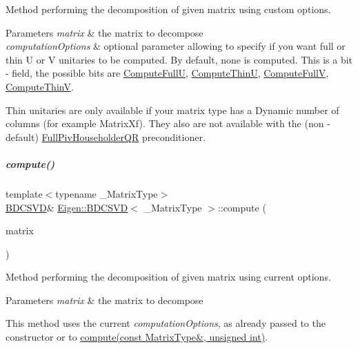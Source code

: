 Method performing the decomposition of given matrix using custom options. 


\begin{DoxyParams}{Parameters}
{\em matrix} & the matrix to decompose \\
\hline
{\em computation\+Options} & optional parameter allowing to specify if you want full or thin U or V unitaries to be computed. By default, none is computed. This is a bit -\/ field, the possible bits are \hyperlink{group__enums_ggae3e239fb70022eb8747994cf5d68b4a9a2b4f91ca5859a4159dbfe8090043817f}{Compute\+FullU}, \hyperlink{group__enums_ggae3e239fb70022eb8747994cf5d68b4a9af8c742a1aa87773e165eae406c9ccaf8}{Compute\+ThinU}, \hyperlink{group__enums_ggae3e239fb70022eb8747994cf5d68b4a9a52c6f7e80bbf9a42297c88f700245b51}{Compute\+FullV}, \hyperlink{group__enums_ggae3e239fb70022eb8747994cf5d68b4a9a1055e53fa95c8ae04a07ebb72cfafd95}{Compute\+ThinV}.\\
\hline
\end{DoxyParams}
Thin unitaries are only available if your matrix type has a Dynamic number of columns (for example Matrix\+Xf). They also are not available with the (non -\/ default) \hyperlink{group___q_r___module_class_eigen_1_1_full_piv_householder_q_r}{Full\+Piv\+Householder\+QR} preconditioner. \mbox{\label{group___s_v_d___module_acf27f41ed044d74ea8e8cbaf17ffdb04}} 
\subparagraph{\texorpdfstring{compute()}{compute()}\hspace{0.1cm}{\footnotesize\ttfamily [3/4]}}
{\footnotesize\ttfamily template$<$typename \+\_\+\+Matrix\+Type$>$ \\
\hyperlink{group___s_v_d___module_class_eigen_1_1_b_d_c_s_v_d}{B\+D\+C\+S\+VD}\& \hyperlink{group___s_v_d___module_class_eigen_1_1_b_d_c_s_v_d}{Eigen\+::\+B\+D\+C\+S\+VD}$<$ \+\_\+\+Matrix\+Type $>$\+::compute (\begin{DoxyParamCaption}\item[{const Matrix\+Type \&}]{matrix }\end{DoxyParamCaption})\hspace{0.3cm}{\ttfamily [inline]}}



Method performing the decomposition of given matrix using current options. 


\begin{DoxyParams}{Parameters}
{\em matrix} & the matrix to decompose\\
\hline
\end{DoxyParams}
This method uses the current {\itshape computation\+Options}, as already passed to the constructor or to \hyperlink{group___s_v_d___module_a52e3c627775010775c64d16a00cdb770}{compute(const Matrix\+Type\&, unsigned int)}. 

